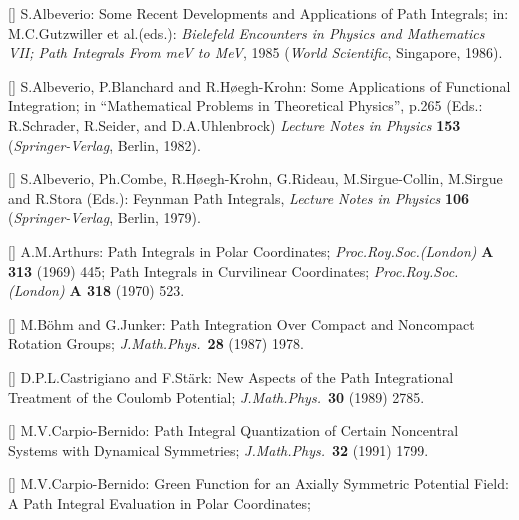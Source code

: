 \item{[\ALB]}
S.Albeverio:
Some Recent Developments and Applications of Path Integrals;
in:
M.C.Gutzwiller et al.(eds.):
{\it Bielefeld Encounters in Physics and Mathematics VII; Path
Integrals From meV to MeV}, 1985
({\it World Scientific}, Singapore, 1986).
\item{[\ABHKa]}
S.Albeverio, P.Blanchard and R.H\o egh-Krohn:
Some Applications of Functional Integration; in ``Mathematical Problems
in Theoretical Physics'', p.265 (Eds.: R.Schrader, R.Seider, and
D.A.Uhlenbrock) {\it Lecture Notes in Physics} {\bf 153}
({\it Springer-Verlag}, Berlin, 1982).
\item{[\ACHRS]}
S.Albeverio, Ph.Combe, R.H\o egh-Krohn, G.Rideau, M.Sirgue-Collin,
M.Sirgue and R.Stora (Eds.):
Feynman Path Integrals, {\it Lecture Notes in Physics} {\bf 106}
({\it Springer-Verlag}, Berlin, 1979).
\item{[\ARTb]}
A.M.Arthurs:
Path Integrals in Polar Coordinates;
{\it Proc.Roy.Soc.(London)} {\bf A 313} (1969) 445;
\newline
Path Integrals in Curvilinear Coordinates;
{\it Proc.Roy.Soc.(London)} {\bf A 318} (1970) 523.
\item{[\BJb]}
M.B\"ohm and G.Junker:
Path Integration Over Compact and Noncompact Rotation Groups;
{\it J.Math.Phys.}\ {\bf 28} (1987) 1978.
\item{[\CAST]}
D.P.L.Castrigiano and F.St\"ark:
New Aspects of the Path Integrational Treatment of the Coulomb
Potential;
{\it J.Math.Phys.}\ {\bf 30} (1989) 2785.
\item{[\CARPa]}
M.V.Carpio-Bernido:
Path Integral Quantization of Certain Noncentral Systems with
Dynamical Symmetries;
{\it J.Math.Phys.}\ {\bf 32} (1991) 1799.
\item{[\CARPb]}
M.V.Carpio-Bernido:
Green Function for an Axially Symmetric Potential Field: A Path
Integral Evaluation in Polar Coordinates;
